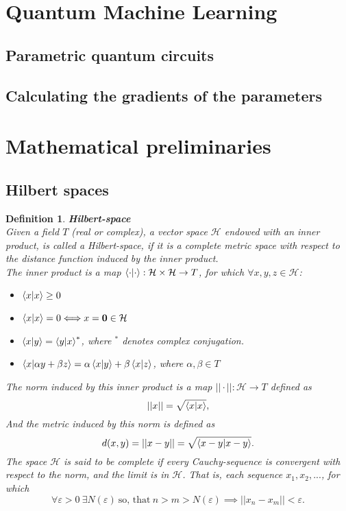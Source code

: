 \documentclass[12pt, a4paper]{article}
\newcommand{\bb}[1]{\mathbf{#1}}
\newtheorem{definition}{Definition}
\begin{document}
\section{Quantum Machine Learning}
\subsection{Parametric quantum circuits}
\subsection{Calculating the gradients of the parameters}




\appendix
\section{Mathematical preliminaries}

\subsection{Hilbert spaces}
\begin{definition}
    \textbf{Hilbert-space}\\
    Given a field $T$ (real or complex), a vector space $\mathcal H$ endowed with an inner product, is called a Hilbert-space, if
    it is a complete metric space with respect to the distance function induced by the inner product.
    \\
    The inner product is a map $\braket{\cdot|\cdot}:\mathcal{H}\times\mathcal{H} \rightarrow T$, 
    for which $\forall x,y,z \in \mathcal H$:
    \begin{itemize}
        \item $\braket{x|x} \geq 0$
        \item $\braket{x|x} = 0 \Longleftrightarrow x = \bb 0 \in \mathcal H$
        \item $\braket{x|y} = \braket{y|x}^*$, where $^*$ denotes complex conjugation.
        \item $\braket{x|\alpha y + \beta z} = \alpha\braket{x|y} + \beta\braket{x|z}$, where $\alpha, \beta \in T$
    \end{itemize}
    The norm induced by this inner product is a map $||\cdot||:\mathcal H \rightarrow T$ defined as
    \begin{equation*}
        ||x||=\sqrt{\braket{x|x}},
    \end{equation*}
    And the metric induced by this norm is defined as
    \begin{equation*}
        d(x,y) = ||x - y|| = \sqrt{\braket{x - y|x - y}}.
    \end{equation*}
    The space $\mathcal H$ is said to be complete if every Cauchy-sequence is convergent with respect to the norm, and
    the limit is in $\mathcal H$. That is, each sequence ${x_1, x_2, ... }$, for which 
    \begin{equation*}
        \forall \varepsilon > 0 ~ \exists N(\varepsilon) ~\textrm{so, that}~ n>m>N(\varepsilon) \implies ||x_n - x_m||<\varepsilon.
    \end{equation*}
\end{definition} 
\end{document}
